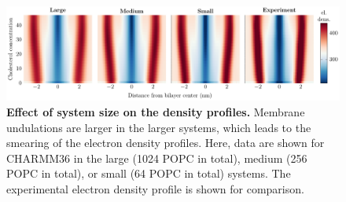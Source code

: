 \documentclass[journal=jpcbfk,manuscript=suppinfo]{achemso}
\begin{document}
\begin{figure}[htb!]
    \centering
    \includegraphics[width=\linewidth]{../FIGS/densityprofiles_size.pdf}
    \caption{\label{SIfig:densprofssize}%
    \textbf{Effect of system size on the density profiles.}
    Membrane undulations are larger in the larger systems, which leads to the smearing of the electron density profiles. Here, data are shown for CHARMM36 in the large (1024 POPC in total), medium (256 POPC in total), or small (64 POPC in total) systems. The experimental electron density profile is shown for comparison.
    }
\end{figure}

\clearpage



\end{document}
